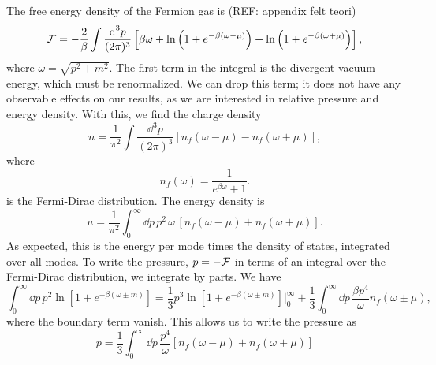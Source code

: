 The free energy density of the Fermion gas is (REF: appendix felt teori)
%
\begin{equation}
    \mathcal{F} = - 
    \frac{2}{\beta}\int \frac{\text{d}^3 p}{(2 \pi)^3} 
    \left[
        \beta \omega
        +
        \ln\left(1 + e^{-\beta(\omega - \mu)}\right)
        + 
        \ln\left(1 + e^{-\beta(\omega + \mu)}\right)
    \right],
\end{equation}
%
where $\omega = \sqrt{p^2 + m^2}$.
The first term in the integral is the divergent vacuum energy, which must be renormalized.
We can drop this term; it does not have any observable effects on our results, as we are interested in relative pressure and energy density.
With this, we find the charge density
%
\begin{equation}
    n = \frac{1}{\pi^2} \int \frac{\dd^3 p}{(2 \pi)^3} [n_f(\omega - \mu) - n_f(\omega + \mu)],
\end{equation}
%
where
%
\begin{equation}
    n_f(\omega) = \frac{1}{e^{\beta \omega} + 1}.
\end{equation}
%
is the Fermi-Dirac distribution.
The energy density is 
%
\begin{equation}
    \label{energy density}
    u = \frac{1}{\pi^2} \int_0^\infty \dd p\, p^2 \, \omega \, [n_f(\omega - \mu) + n_f(\omega + \mu)].
\end{equation}
%
As expected, this is the energy per mode times the density of states, integrated over all modes.
To write the pressure, $p = - \mathcal{F}$ in terms of an integral over the Fermi-Dirac distribution, we integrate by parts.
We have
%
\begin{equation}
    \int_0^\infty \dd p \, p^2 \ln\left[1 + e^{-\beta(\omega \pm m)}\right]
    = 
    \frac{1}{3} p^3\ln\left[1 + e^{-\beta(\omega \pm m)}\right] \bigg |_0^\infty
    + 
    \frac{1}{3} \int_0^\infty \dd p \, \frac{ \beta p^4}{\omega}n_f(\omega \pm \mu),
\end{equation}
%
where the boundary term vanish.
This allows us to write the pressure as 
%
\begin{equation}
    \label{pressure}
    p = \frac{1}{3} \int_0^\infty \dd p \, \frac{p^4}{\omega} [n_f(\omega - \mu) + n_f(\omega + \mu)]
\end{equation}


